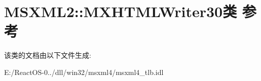 \hypertarget{class_m_s_x_m_l2_1_1_m_x_h_t_m_l_writer30}{}\section{M\+S\+X\+M\+L2\+:\+:M\+X\+H\+T\+M\+L\+Writer30类 参考}
\label{class_m_s_x_m_l2_1_1_m_x_h_t_m_l_writer30}


该类的文档由以下文件生成\+:\begin{DoxyCompactItemize}
\item 
E\+:/\+React\+O\+S-\/0../dll/win32/msxml4/msxml4\+\_\+tlb.\+idl\end{DoxyCompactItemize}
